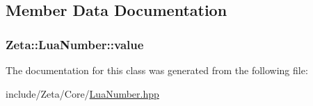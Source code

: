 \subsection{Member Data Documentation}
\hypertarget{classZeta_1_1LuaNumber_a8c5f69af7e47bc7411c00c712d62646b}{
\subsubsection[{value}]{ Zeta\+::\+Lua\+Number\+::value\hspace{0.3cm}{\ttfamily [private]}}}\label{classZeta_1_1LuaNumber_a8c5f69af7e47bc7411c00c712d62646b}


The documentation for this class was generated from the following file\+:\begin{DoxyCompactItemize}
\item 
include/\+Zeta/\+Core/\hyperlink{LuaNumber_8hpp}{Lua\+Number.\+hpp}\end{DoxyCompactItemize}

